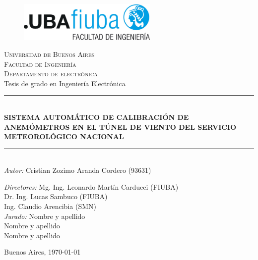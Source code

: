 \begin{titlepage}
\newcommand{\HRule}{\rule{\linewidth}{0.5mm}} 
\center 
\begin{figure}[H]
\centering
\includegraphics[width=0.6\textwidth]{fiuba_logo.jpg}
\end{figure}
\textsc{\large Universidad de Buenos Aires}\\[0.1cm] 
\textsc{\large Facultad de Ingeniería}\\[0.1cm]
\textsc{\large Departamento de electrónica}\\[1cm]

{\LARGE Tesis de grado en Ingeniería Electrónica} \\[0.1cm]

\HRule \\[0.1cm]
{\LARGE \bfseries SISTEMA AUTOMÁTICO DE CALIBRACIÓN DE ANEMÓMETROS EN EL TÚNEL DE VIENTO DEL SERVICIO METEOROLÓGICO NACIONAL}\\
\HRule \\[0.1cm]

\Large \emph{Autor:} \Large Cristian Zozimo Aranda Cordero (93631) \\[0.1cm]
\begin{flushleft}
\Large \emph{Directores:} \hspace{0.5em} \Large Mg. Ing. Leonardo Martín Carducci (FIUBA) \\[0.1cm]
\hspace{6em}\Large  Dr. Ing. Lucas Sambuco (FIUBA) \\
\hspace{6em}\Large  Ing. Claudio Arencibia (SMN)\\[0.5cm]
\Large \emph{Jurado:} \hspace{0.5em} \Large  Nombre y apellido \\
\hspace{4.5em}\Large  Nombre y apellido\\
\hspace{4.5em}\Large  Nombre y apellido\\[1cm] 
\end{flushleft}
\large  Buenos Aires, \today
\vfill 
\end{titlepage}
